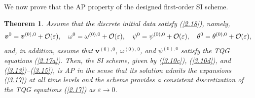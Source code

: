\documentclass[a4paper,11pt,twoside]{article}
\newtheorem{theorem}{Theorem}[section]
\numberwithin{equation}{section}
\numberwithin{figure}{section}
\numberwithin{table}{section}
\newcommand{\eps}{\varepsilon}
\newcommand{\bv}{\bm{v}}
\newcommand\eref[1]{(\ref{#1})}
\begin{document}
\smallskip
We now prove that the AP property of the designed first-order SI scheme.
\begin{theorem}
Assume that the discrete initial data satisfy \eref{2.18}, namely, 
\begin{equation}
\bv^0=\bv^{(0),0}+{\cal O}(\eps),\quad\omega^0=\omega^{(0),0}+{\cal O}(\eps),\quad\psi^0=\psi^{(0),0}+{\cal O}(\eps),\quad
\theta^0=\theta^{(0),0}+{\cal O}(\eps),
\label{3.17}
\end{equation}
and, in addition, assume that $\bv^{(0),0}$, $\omega^{(0),0}$, and $\psi^{(0),0}$ satisfy the TQG equations \eref{2.17a}. Then, the SI
scheme, given by \eref{3.10c}, \eref{3.10d}, and \eref{3.13}--\eref{3.15}, is AP in the sense that its solution admits the expansions
\eref{3.17} at all time levels and the scheme provides a consistent discretization of the TQG equations \eref{2.17} as $\eps\to0$.
\end{theorem}
\end{document}
